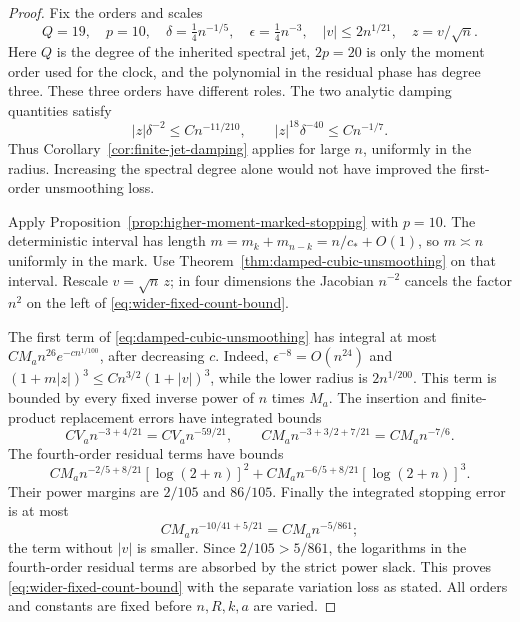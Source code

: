 \begin{proof}
Fix the orders and scales
\begin{equation}\label{eq:wider-fixed-scales}
 Q=19,\quad p=10,\quad
 \delta=\tfrac14n^{-1/5},\quad
 \epsilon=\tfrac14n^{-3},\quad |v|\le2n^{1/21},\quad z=v/\sqrt n.
\end{equation}
Here $Q$ is the degree of the inherited spectral jet, $2p=20$ is
only the moment order used for the clock, and the polynomial in the
residual phase has degree three. These three orders have different roles.
The two analytic damping quantities satisfy
\[
 |z|\delta^{-2}\le Cn^{-11/210},\qquad
 |z|^{18}\delta^{-40}\le Cn^{-1/7}.
\]
Thus Corollary~\ref{cor:finite-jet-damping} applies for large $n$,
uniformly in the radius. Increasing the spectral degree alone would
not have improved the first-order unsmoothing loss.

Apply Proposition~\ref{prop:higher-moment-marked-stopping} with
$p=10$. The deterministic interval has length
$m=m_k+m_{n-k}=n/c_*+O(1)$, so $m\asymp n$ uniformly in the mark.
Use Theorem~\ref{thm:damped-cubic-unsmoothing} on that interval.
Rescale $v=\sqrt n\,z$; in four dimensions the Jacobian $n^{-2}$
cancels the factor $n^2$ on the left of
\eqref{eq:wider-fixed-count-bound}.

The first term of \eqref{eq:damped-cubic-unsmoothing} has integral
at most $CM_an^{26}e^{-c n^{1/100}}$, after decreasing $c$.
Indeed, $\epsilon^{-8}=O(n^{24})$ and
$(1+m|z|)^3\le Cn^{3/2}(1+|v|)^3$, while the lower radius is
$2n^{1/200}$. This term is bounded by every fixed inverse power
of $n$ times $M_a$. The insertion and finite-product replacement
errors have integrated bounds
\[
 CV_a n^{-3+4/21}=CV_a n^{-59/21},\qquad
 CM_a n^{-3+3/2+7/21}=CM_a n^{-7/6}.
\]
The fourth-order residual terms have bounds
\[
 CM_a n^{-2/5+8/21}[\log(2+n)]^2
   +CM_a n^{-6/5+8/21}[\log(2+n)]^3.
\]
Their power margins are $2/105$ and $86/105$. Finally the integrated
stopping error is at most
\[
 CM_a n^{-10/41+5/21}=CM_a n^{-5/861};
\]
the term without $|v|$ is smaller. Since $2/105>5/861$, the logarithms
in the fourth-order residual terms are absorbed by the strict power
slack. This proves \eqref{eq:wider-fixed-count-bound} with the
separate variation loss as stated. All orders and constants are fixed
before $n,R,k,a$ are varied.
\end{proof}

